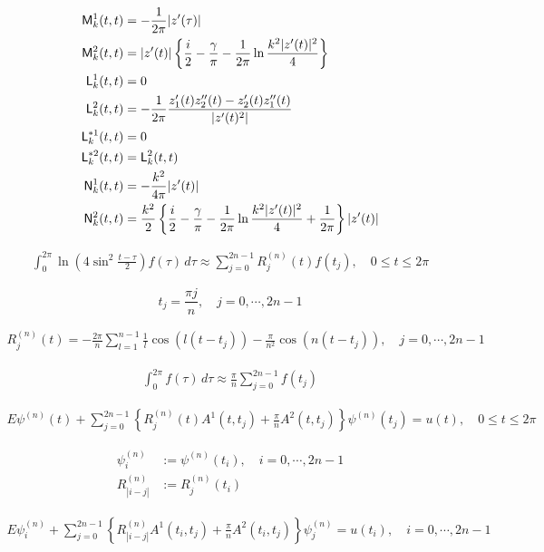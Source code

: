 \begin{subequations}
\begin{align}
  {\sf M}_k^1(t,t) &= -\frac{1}{2\pi}|z'(\tau)| \\
  {\sf M}_k^2(t,t) &= |z'(t)|\left\{\frac{i}{2}-\frac{\gamma}{\pi}-\frac{1}{2\pi}\ln\frac{k^2|z'(t)|^2}{4}\right\} \\
  {\sf L}_k^1(t,t) &= 0 \\
  {\sf L}_k^2(t,t) &= -\frac{1}{2\pi}\frac{z'_1(t)z''_2(t)-z'_2(t)z''_1(t)}{|z'(t)^2|} \\
  {\sf L}_k^{*1}(t,t) &= 0 \\
  {\sf L}_k^{*2}(t,t) &= {\sf L}_k^2(t,t) \\
  {\sf N}_k^1(t,t) &= -\frac{k^2}{4\pi}|z'(t)|\\ 
  {\sf N}_k^2(t,t) &= \frac{k^2}{2}\left\{\frac{i}{2}-\frac{\gamma}{\pi}-\frac{1}{2\pi}\ln\frac{k^2|z'(t)|^2}{4}+\frac{1}{2\pi}\right\}|z'(t)| 
\end{align}
\end{subequations}

\begin{align}
  \int_0^{2\pi}\ln\left(4\sin^2\frac{t-\tau}{2}\right)f(\tau)\,d\tau\approx\sum_{j=0}^{2n-1}R^{(n)}_j(t)f(t_j),\quad 0\leqslant t\leqslant 2\pi
\end{align}

$$t_j=\frac{\pi j}{n},\quad j=0,\cdots,2n-1$$

\begin{align}
  R^{(n)}_j(t) = -\frac{2\pi}{n}\sum_{l=1}^{n-1}\frac{1}{l}\cos\left(l(t-t_j)\right)-\frac{\pi}{n^2}\cos\left(n(t-t_j)\right), \quad j=0,\cdots,2n-1
\end{align}

\begin{align}
  \int_0^{2\pi}f(\tau)\,d\tau\approx\frac{\pi}{n}\sum_{j=0}^{2n-1}f(t_j)
\end{align}

\begin{align}
  E\psi^{(n)}(t) + \sum_{j=0}^{2n-1}\left\{R^{(n)}_j(t)A^1(t, t_j) + \frac{\pi}{n}A^2(t, t_j)\right\}\psi^{(n)}(t_j) = u(t), \quad 0\leqslant t\leqslant 2\pi
\end{align}

\begin{align}
  \psi_i^{(n)} &:= \psi^{(n)}(t_i),\quad i=0,\cdots,2n-1 \\
  R^{(n)}_{|i-j|} &:= R^{(n)}_j(t_i) 
\end{align}

\begin{align}
  E\psi_i^{(n)} + \sum_{j=0}^{2n-1}\left\{R^{(n)}_{|i-j|}A^1(t_i, t_j) + \frac{\pi}{n}A^2(t_i, t_j)\right\}\psi_j^{(n)} = u(t_i),\quad i=0,\cdots,2n-1 
\end{align}

